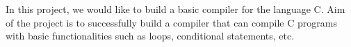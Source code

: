 In this project, we would like to build a basic compiler for the language C. Aim of the project is to successfully build a compiler that can compile C programs with basic functionalities such as loops, conditional statements, etc.